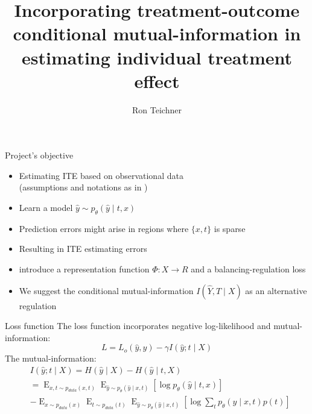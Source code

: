 \documentclass{beamer}
\title[Incorporating conditional mutual-information of treatment-outcome in estimating individual treatment effect]{
  Incorporating treatment-outcome conditional mutual-information in estimating individual treatment effect}
\author[Ron Teichner]{
  Ron Teichner}%
\institute[$(\text{RL})^\mathbf{2}$]{
  097400 - Introduction to causal inference\\Final project}
\date[January 2020]{}
\begin{document}
\begin{frame}
  \titlepage
\end{frame}


\begin{frame}{Project's objective}
    \begin{itemize}
        \item<1-> Estimating ITE based on observational data\\
        (assumptions and notations as in \cite{pmlr-v70-shalit17a})
        \item<2-> Learn a model $\hat{y} \sim p_\theta(\hat{y} \mid t,x)$
        \item<3-> Prediction errors might arise in regions where $\{x,t\}$ is sparse
        \item<4-> Resulting in ITE estimating errors
        \item<5-> \cite{pmlr-v70-shalit17a} introduce a representation function $\Phi: X \rightarrow R$ and a balancing-regulation loss
        \item<6-| alert@6> We suggest the conditional mutual-information $I(\hat{Y},T \mid X)$ as an alternative regulation 
    \end{itemize}
\end{frame}
\begin{frame}{Loss function}
    The loss function incorporates negative log-likelihood and mutual-information:
    \begin{equation}\label{eq:loss}
        L = L_o(\hat{y}, y) - \gamma I(\hat{y};t \mid X)
    \end{equation}
    The mutual-information:
    \begin{equation}\label{eq:mi}
        \begin{split}
            &I(\hat{y};t \mid X) = H(\hat{y} \mid X) - H(\hat{y} \mid t,X)\\
            &= \operatorname{E}_{x,t \sim p_{data}(x,t)} \operatorname{E}_{\hat{y} \sim p_\theta(\hat{y} \mid x,t)} \left[ \operatorname{log} p_\theta(\hat{y} \mid t,x) \right]\\
            &-\operatorname{E}_{x \sim p_{data}(x)} \operatorname{E}_{t \sim p_{data}(t)} \operatorname{E}_{\hat{y} \sim p_\theta(\hat{y} \mid x,t)} \left[ \operatorname{log} \sum_t p_\theta(\hat{y} \mid x, t)p(t) \right]\\
        \end{split}
    \end{equation}
\end{frame}
\end{document}
